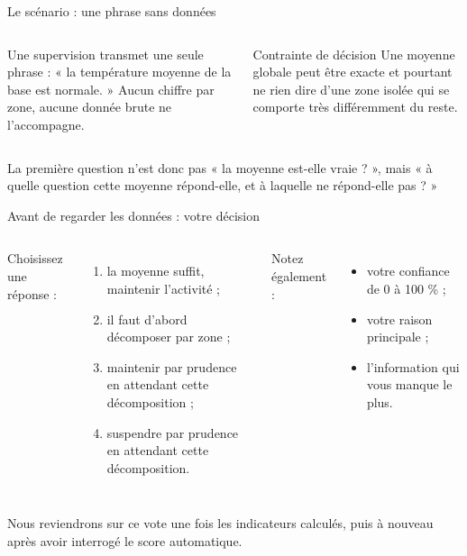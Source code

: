 \documentclass[aspectratio=169]{beamer}
\begin{document}
\begin{frame}{Le scénario : une phrase sans données}
  \begin{columns}[T]
    Une supervision transmet une seule phrase : « la température moyenne de la base est normale. » Aucun chiffre par zone, aucune donnée brute ne l'accompagne.
    \begin{block}{Contrainte de décision}
      Une moyenne globale peut être exacte et pourtant ne rien dire d'une zone isolée qui se comporte très différemment du reste.
    \end{block}
  \end{columns}
  \vfill
  \alert{La première question n'est donc pas « la moyenne est-elle vraie ? », mais « à quelle question cette moyenne répond-elle, et à laquelle ne répond-elle pas ? »}
\end{frame}

\begin{frame}{Avant de regarder les données : votre décision}
  \begin{columns}[T]
    Choisissez une réponse :
    \begin{enumerate}
      \item[A.] la moyenne suffit, maintenir l'activité ;
      \item[B.] il faut d'abord décomposer par zone ;
      \item[C.] maintenir par prudence en attendant cette décomposition ;
      \item[D.] suspendre par prudence en attendant cette décomposition.
    \end{enumerate}
    Notez également :
    \begin{itemize}
      \item votre confiance de 0 à 100 \% ;
      \item votre raison principale ;
      \item l'information qui vous manque le plus.
    \end{itemize}
  \end{columns}
  \vfill
  \alert{Nous reviendrons sur ce vote une fois les indicateurs calculés, puis à nouveau après avoir interrogé le score automatique.}
\end{frame}
\end{document}
